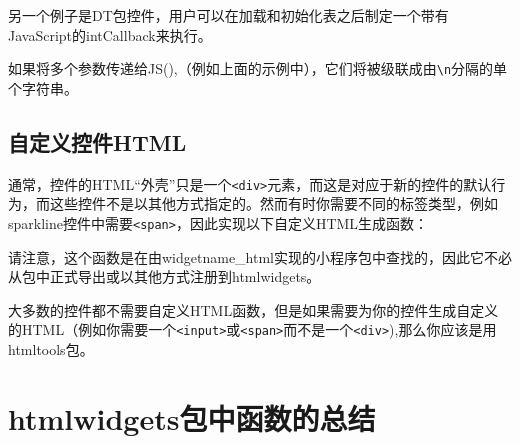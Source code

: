 \documentclass[]{book}
\newenvironment{Shaded}{\begin{snugshade}}{\end{snugshade}}
\newcommand{\KeywordTok}[1]{\textcolor[rgb]{0.13,0.29,0.53}{\textbf{#1}}}
\newcommand{\DataTypeTok}[1]{\textcolor[rgb]{0.13,0.29,0.53}{#1}}
\newcommand{\DecValTok}[1]{\textcolor[rgb]{0.00,0.00,0.81}{#1}}
\newcommand{\StringTok}[1]{\textcolor[rgb]{0.31,0.60,0.02}{#1}}
\newcommand{\ControlFlowTok}[1]{\textcolor[rgb]{0.13,0.29,0.53}{\textbf{#1}}}
\newcommand{\OperatorTok}[1]{\textcolor[rgb]{0.81,0.36,0.00}{\textbf{#1}}}
\newcommand{\NormalTok}[1]{#1}
\theoremstyle{definition}
\theoremstyle{definition}
\theoremstyle{definition}
\theoremstyle{remark}
\begin{document}
另一个例子是DT包控件，用户可以在加载和初始化表之后制定一个带有JavaScript的intCallback来执行。

\begin{Shaded}
\end{Shaded}

如果将多个参数传递给JS(),（例如上面的示例中），它们将被级联成由\texttt{\textbackslash{}n}分隔的单个字符串。

\section{自定义控件HTML}\label{html}

通常，控件的HTML``外壳''只是一个\texttt{\textless{}div\textgreater{}}元素，而这是对应于新的控件的默认行为，而这些控件不是以其他方式指定的。然而有时你需要不同的标签类型，例如sparkline控件中需要\texttt{\textless{}span\textgreater{}}，因此实现以下自定义HTML生成函数：

\begin{Shaded}
\end{Shaded}

请注意，这个函数是在由widgetname\_html实现的小程序包中查找的，因此它不必从包中正式导出或以其他方式注册到htmlwidgets。

大多数的控件都不需要自定义HTML函数，但是如果需要为你的控件生成自定义的HTML（例如你需要一个\texttt{\textless{}input\textgreater{}}或\texttt{\textless{}span\textgreater{}}而不是一个\texttt{\textless{}div\textgreater{}}),那么你应该是用htmltools包。

\chapter{htmlwidgets包中函数的总结}\label{htmlwidgets-pkgintro}
\end{document}
